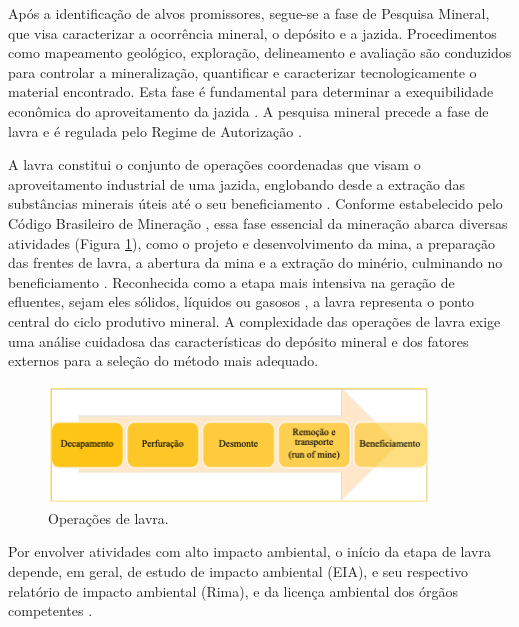 Após a identificação de alvos promissores, segue-se a fase de Pesquisa Mineral, que visa caracterizar a ocorrência mineral, o depósito e a jazida. Procedimentos como mapeamento geológico, exploração, delineamento e avaliação são conduzidos para controlar a mineralização, quantificar e caracterizar tecnologicamente o material encontrado. Esta fase é fundamental para determinar a exequibilidade econômica do aproveitamento da jazida \cite{freire2020}. A pesquisa mineral precede a fase de lavra e é regulada pelo Regime de Autorização \cite{anm2022}.

A lavra constitui o conjunto de operações coordenadas que visam o aproveitamento industrial de uma jazida, englobando desde a extração das substâncias minerais úteis até o seu beneficiamento \cite{jr2019}. Conforme estabelecido pelo Código Brasileiro de Mineração \cite{brasil1967}, essa fase essencial da mineração abarca diversas atividades (Figura \ref{fig:operacoes_lavra}), como o projeto e desenvolvimento da mina, a preparação das frentes de lavra, a abertura da mina e a extração do minério, culminando no beneficiamento \cite{carvalho2018, freire2020}. Reconhecida como a etapa mais intensiva na geração de efluentes, sejam eles sólidos, líquidos ou gasosos \cite{carvalho2018, freire2020}, a lavra representa o ponto central do ciclo produtivo mineral. A complexidade das operações de lavra exige uma análise cuidadosa das características do depósito mineral e dos fatores externos para a seleção do método mais adequado.

\begin{figure}[!htb]
    \centering
    \includegraphics[width=0.9\textwidth]{figures/image16_operacoes_lavra.png}
    \caption{Operações de lavra.}
    \label{fig:operacoes_lavra}
\end{figure}

Por envolver atividades com alto impacto ambiental, o início da etapa de lavra depende, em geral, de estudo de impacto ambiental (EIA), e seu respectivo relatório de impacto ambiental (Rima), e da licença ambiental dos órgãos competentes \cite{carvalho2018}.

